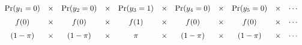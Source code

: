 \documentclass[border=3bp,varwidth=7in]{standalone}
\begin{document}
\[
\begin{array}{c c c c c c c c c c c}
   \Pr(y_1=0) & \times & \Pr(y_2=0) & \times & \Pr(y_3=1) & \times & \Pr(y_4=0) & \times & \Pr(y_5=0) & \times & \cdots \\[6pt]
   f(0)       & \times & f(0)       & \times & f(1)       & \times & f(0)       & \times & f(0)       & \times & \cdots \\[6pt]
   (1-\pi)    & \times & (1-\pi)    & \times & \pi        & \times & (1-\pi)    & \times & (1-\pi)    & \times & \cdots
\end{array}
\]
\end{document}
